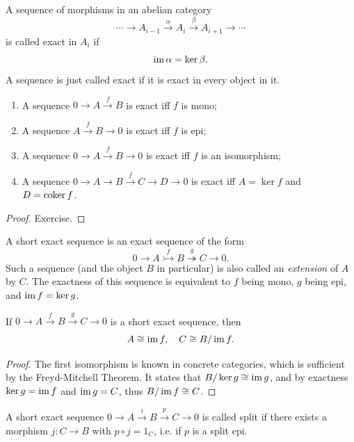 \begin{defn}
    A sequence of morphisms in an abelian category 
    \[\cdots \to A_{i-1}\overset{\alpha}\to A_i\overset{\beta}\to A_{i+1}\to \cdots\]
    is called exact in $A_i$ if 
    \[\operatorname{im}\alpha=\ker\beta.\]
    A sequence is just called exact if it is exact in every object in it.
\end{defn}

\begin{prop}
    \begin{enumerate}
        \item A sequence $0\to A\overset f\to B$ is exact iff $f$ is mono;
        \item A sequence $A\overset f\to B\to 0$ is exact iff $f$ is epi;
        \item A sequence $0\to A\overset f\to B\to 0$ is exact iff $f$ is an isomorphism;
        \item A sequence $0\to A\to B\overset f\to C\to D\to 0$ is exact iff $A=\ker f$ and $D=\operatorname{coker} f$.
    \end{enumerate}
\end{prop}
\begin{proof}
    Exercise.
\end{proof}

\begin{defn}
 A short exact sequence is an exact sequence of the form
 \[0\to A\overset f\rightarrowtail B\overset g \twoheadrightarrow C\to 0.\]
 Such a sequence (and the object $B$ in particular) is also called an \emph{extension} of $A$ by $C$. The exactness of this sequence is equivalent to $f$ being mono, $g$ being epi, and $\operatorname{im} f=\ker g$.
\end{defn}

\begin{prop}
    If $0\to A\overset f\to B\overset g \to C\to 0$ is a short exact sequence, then 
    \[A\cong \operatorname{im} f,\quad C\cong B/\operatorname{im} f.\]
\end{prop}
\begin{proof}
    The first isomorphism is known in concrete categories, which is sufficient by the Freyd-Mitchell Theorem. It states that $B/\ker g\cong \operatorname{im} g$, and by exactness $\ker g=\operatorname{im} f$ and $\operatorname{im} g=C$, thus $B/\operatorname{im} f\cong C$.
\end{proof}

\begin{defn}
    A short exact sequence $0\to A\overset i\to B\overset p \to C\to 0$ is called split if there exists a morphism $j:C\to B$ with $p\circ j=1_C$, i.e. if $p$ is a split epi.
\end{defn}

